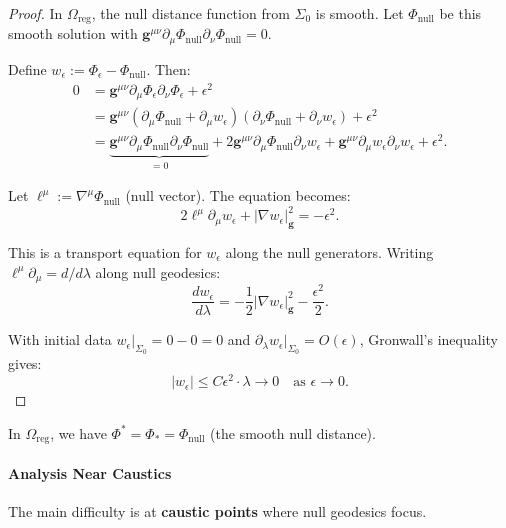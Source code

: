 \begin{proof}
In $\Omega_{\text{reg}}$, the null distance function from $\Sigma_0$ is smooth. Let $\Phi_{\text{null}}$ be this smooth solution with $\mathbf{g}^{\mu\nu}\partial_\mu\Phi_{\text{null}}\partial_\nu\Phi_{\text{null}} = 0$.

Define $w_\epsilon := \Phi_\epsilon - \Phi_{\text{null}}$. Then:
\begin{align}
    0 &= \mathbf{g}^{\mu\nu}\partial_\mu\Phi_\epsilon\partial_\nu\Phi_\epsilon + \epsilon^2 \\
    &= \mathbf{g}^{\mu\nu}(\partial_\mu\Phi_{\text{null}} + \partial_\mu w_\epsilon)(\partial_\nu\Phi_{\text{null}} + \partial_\nu w_\epsilon) + \epsilon^2 \\
    &= \underbrace{\mathbf{g}^{\mu\nu}\partial_\mu\Phi_{\text{null}}\partial_\nu\Phi_{\text{null}}}_{=0} + 2\mathbf{g}^{\mu\nu}\partial_\mu\Phi_{\text{null}}\partial_\nu w_\epsilon + \mathbf{g}^{\mu\nu}\partial_\mu w_\epsilon\partial_\nu w_\epsilon + \epsilon^2.
\end{align}

Let $\ell^\mu := \nabla^\mu\Phi_{\text{null}}$ (null vector). The equation becomes:
\[
2\ell^\mu\partial_\mu w_\epsilon + |\nabla w_\epsilon|_{\mathbf{g}}^2 = -\epsilon^2.
\]

This is a transport equation for $w_\epsilon$ along the null generators. Writing $\ell^\mu\partial_\mu = d/d\lambda$ along null geodesics:
\[
\frac{dw_\epsilon}{d\lambda} = -\frac{1}{2}|\nabla w_\epsilon|_{\mathbf{g}}^2 - \frac{\epsilon^2}{2}.
\]

With initial data $w_\epsilon|_{\Sigma_0} = 0 - 0 = 0$ and $\partial_\lambda w_\epsilon|_{\Sigma_0} = O(\epsilon)$, Gronwall's inequality gives:
\[
|w_\epsilon| \leq C\epsilon^2 \cdot \lambda \to 0 \quad \text{as } \epsilon \to 0.
\]
\end{proof}

\begin{corollary}\label{cor:uniqueaway}
In $\Omega_{\text{reg}}$, we have $\Phi^* = \Phi_* = \Phi_{\text{null}}$ (the smooth null distance).
\end{corollary}

\paragraph{Analysis Near Caustics}

The main difficulty is at \textbf{caustic points} where null geodesics focus.

